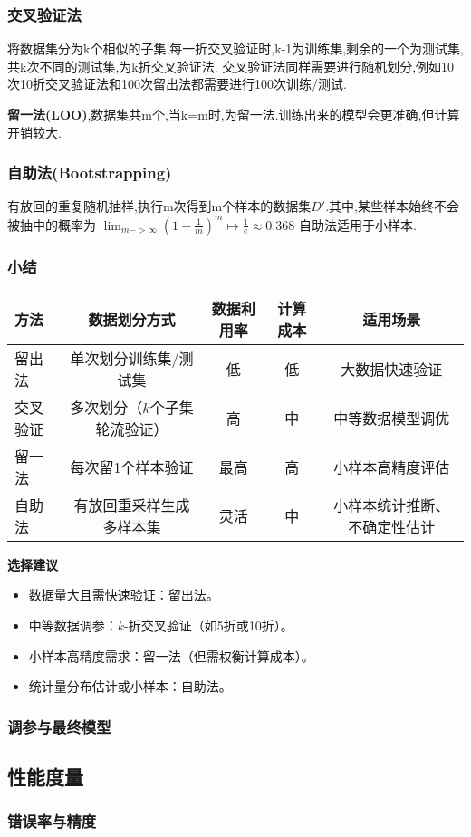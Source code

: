 \subsubsection{交叉验证法}
将数据集分为k个相似的子集,每一折交叉验证时,k-1为训练集,剩余的一个为测试集,共k次不同的测试集,为k折交叉验证法.
交叉验证法同样需要进行随机划分,例如10次10折交叉验证法和100次留出法都需要进行100次训练/测试.
\par \textbf{\heiti 留一法(LOO)},数据集共m个,当k=m时,为留一法.训练出来的模型会更准确,但计算开销较大.
\subsubsection{自助法(Bootstrapping)}
有放回的重复随机抽样,执行m次得到m个样本的数据集$D'$.其中,某些样本始终不会被抽中的概率为
$\lim_{m->\infty}(1-\frac{1}{m})^m\mapsto\frac{1}{e}\approx 0.368$
自助法适用于小样本.
\subsubsection{小结}
\begin{table}[ht]
\centering
\begin{tabular}{lcccc}
\toprule
\textbf{方法} & \textbf{数据划分方式} & \textbf{数据利用率} & \textbf{计算成本} & \textbf{适用场景} \\
\midrule
留出法 & 单次划分训练集/测试集 & 低 & 低 & 大数据快速验证 \\
交叉验证 & 多次划分（\(k\)个子集轮流验证） & 高 & 中 & 中等数据模型调优 \\
留一法 & 每次留1个样本验证 & 最高 & 高 & 小样本高精度评估 \\
自助法 & 有放回重采样生成多样本集 & 灵活 & 中 & 小样本统计推断、不确定性估计 \\
\bottomrule
\end{tabular}
\end{table}

\textbf{\heiti 选择建议}
\begin{itemize}[noitemsep]
    \item 数据量大且需快速验证：留出法。
    \item 中等数据调参：\(k\)-折交叉验证（如5折或10折）。
    \item 小样本高精度需求：留一法（但需权衡计算成本）。
    \item 统计量分布估计或小样本：自助法。
\end{itemize}
\subsubsection{调参与最终模型}
\newpage
\subsection{性能度量}

\subsubsection{错误率与精度}
